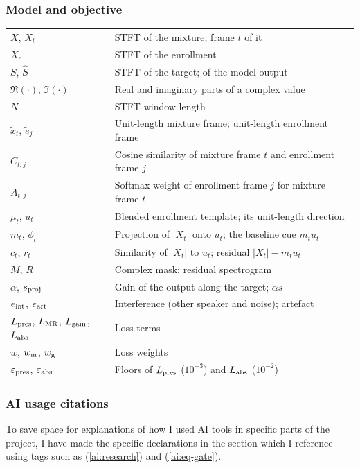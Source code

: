 \subsubsection*{Model and objective}
\begin{longtable}[l]{@{}ll@{}}
$X$, $X_t$ & STFT of the mixture; frame $t$ of it \\
$X_e$ & STFT of the enrollment \\
$S$, $\hat{S}$ & STFT of the target; of the model output \\
$\Re(\cdot)$, $\Im(\cdot)$ & Real and imaginary parts of a complex value \\
$N$ & STFT window length \\
$\tilde{x}_t$, $\tilde{e}_j$ & Unit-length mixture frame; unit-length enrollment frame \\
$C_{t,j}$ & Cosine similarity of mixture frame $t$ and enrollment frame $j$ \\
$A_{t,j}$ & Softmax weight of enrollment frame $j$ for mixture frame $t$ \\
$\mu_t$, $u_t$ & Blended enrollment template; its unit-length direction \\
$m_t$, $\phi_t$ & Projection of $|X_t|$ onto $u_t$; the baseline cue $m_t u_t$ \\
$c_t$, $r_t$ & Similarity of $|X_t|$ to $u_t$; residual $|X_t| - m_t u_t$ \\
$M$, $R$ & Complex mask; residual spectrogram \\
$\alpha$, $s_\textup{proj}$ & Gain of the output along the target; $\alpha s$ \\
$e_\textup{int}$, $e_\textup{art}$ & Interference (other speaker and noise); artefact \\
$L_\textup{pres}$, $L_\textup{MR}$, $L_\textup{gain}$, $L_\textup{abs}$ & Loss terms \\
$w$, $w_\textup{m}$, $w_\textup{g}$ & Loss weights \\  %
$\varepsilon_\textup{pres}$, $\varepsilon_\textup{abs}$ & Floors of $L_\textup{pres}$ ($10^{-3}$) and $L_\textup{abs}$ ($10^{-2}$) \\
\end{longtable}

\subsubsection*{AI usage citations}
To save space for explanations of how I used AI tools in specific parts of the project, I have made the specific declarations in the  section which I reference using tags such as (\ref{ai:research}) and (\ref{ai:eq-gate}). 
